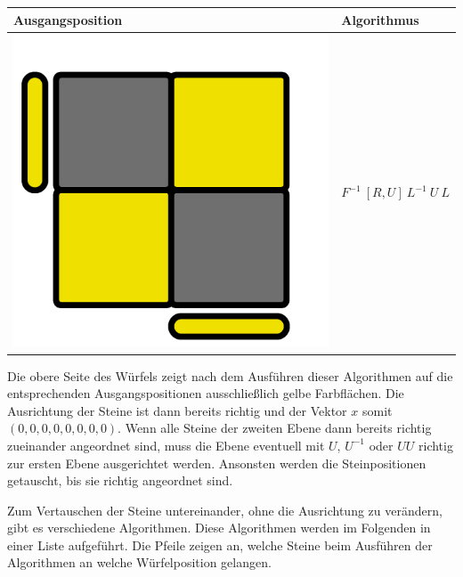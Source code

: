 \documentclass[12pt,a4paper, usenames, dvipsnames]{article}
\theoremstyle{mystyle}
\theoremstyle{definition}
\begin{document}
\begin{center}
\begin{tabular}{m{4cm} m{6cm}}
\toprule
Ausgangsposition & Algorithmus  \\
\midrule

\includegraphics[scale=0.08]{TOPVIEW6.png} & $F^{-1} \ [ R,U ]\ L^{-1} \ U \ L$ \\
\bottomrule
\end{tabular}
\end{center}


Die obere Seite des Würfels zeigt nach dem Ausführen dieser Algorithmen auf die entsprechenden Ausgangspositionen ausschließlich gelbe Farbflächen. Die Ausrichtung der Steine ist dann bereits richtig und der Vektor $x$ somit $(0,0,0,0,0,0,0,0)$. Wenn alle Steine der zweiten Ebene dann bereits richtig zueinander angeordnet sind, muss die Ebene eventuell mit $U$, $U^{-1}$ oder $UU$ richtig zur ersten Ebene ausgerichtet werden.  Ansonsten werden die Steinpositionen getauscht, bis sie richtig angeordnet sind.

Zum Vertauschen der Steine untereinander, ohne die Ausrichtung zu verändern, gibt es verschiedene Algorithmen. Diese Algorithmen werden im Folgenden in einer Liste aufgeführt. Die Pfeile zeigen an, welche Steine beim Ausführen der Algorithmen an welche Würfelposition gelangen.
\end{document}
